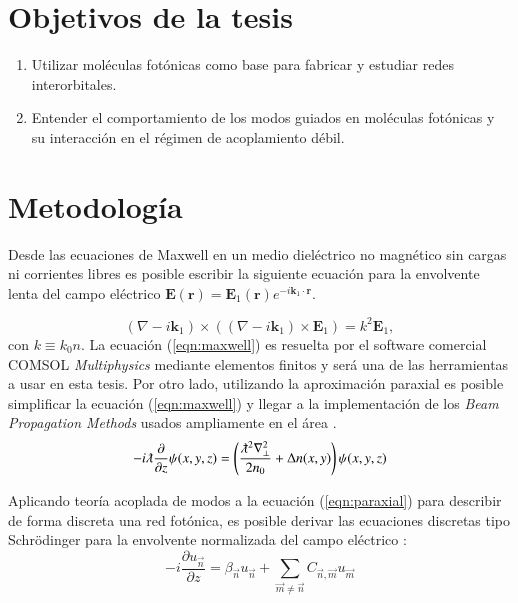 \documentclass{article}
\begin{document}
\section{Objetivos de la tesis}
\begin{enumerate}
	\item Utilizar moléculas fotónicas como base para fabricar y estudiar redes interorbitales.
	\item Entender el comportamiento de los modos guiados en moléculas fotónicas y su interacción en el régimen de acoplamiento débil.
\end{enumerate}
\section{Metodología}

Desde las ecuaciones de Maxwell en un medio dieléctrico no magnético sin cargas ni corrientes libres es posible escribir la siguiente ecuación para la envolvente lenta del campo eléctrico $\textbf{E}(\textbf{r}) = \textbf{E}_1(\textbf{r}) e^{-i \textbf{k}_1 \cdot \textbf{r}}$.

\begin{equation}
	(\nabla-i\textbf{k}_1)\times((\nabla-i\textbf{k}_1)\times \textbf{E}_1) = k^2 \textbf{E}_1,
	 \label{eqn:maxwell}
\end{equation}
con $k \equiv k_0 n$.
La ecuación (\ref{eqn:maxwell}) es resuelta por el software comercial COMSOL \textit{Multiphysics} mediante elementos finitos y será una de las herramientas a usar en esta tesis. Por otro lado, utilizando la aproximación paraxial es posible simplificar la ecuación (\ref{eqn:maxwell}) y llegar a la implementación de los \textit{Beam Propagation Methods} usados ampliamente en el área \cite{bics, interorbital, OAMCaging, vortex, bpm}.
\begin{equation}
	-i\lambdabar\frac{\partial}{\partial z}\psi(x,y,z) = \left(\frac{\lambdabar^2\nabla_\perp^2}{2n_0} + \Delta n(x,y)\right) \psi (x,y,z) \label{eqn:paraxial}
\end{equation}

Aplicando teoría acoplada de modos a la ecuación (\ref{eqn:paraxial}) para describir de forma discreta una red fotónica, es posible derivar las ecuaciones discretas tipo Schrödinger para la envolvente normalizada del campo eléctrico \cite{discretesolitons}:
\begin{equation}
	-i\frac{\partial u_{\vec{n}} }{\partial z} = \beta_{\vec{n}}u_{\vec{n}} + \sum_{\vec{m}\neq\vec{n}} C_{\vec{n},\vec{m}}u_{\vec{m}} \label{eqn:CMT}
\end{equation}
\end{document}
